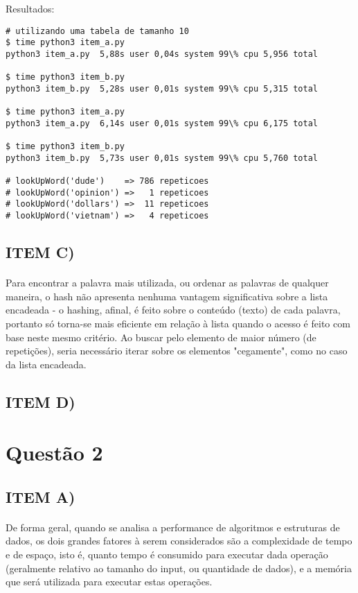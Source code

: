 \documentclass[12pt, letterpaper]{article}
\begin{document}
Resultados:

\begin{lstlisting}
# utilizando uma tabela de tamanho 10
$ time python3 item_a.py
python3 item_a.py  5,88s user 0,04s system 99\% cpu 5,956 total

$ time python3 item_b.py
python3 item_b.py  5,28s user 0,01s system 99\% cpu 5,315 total

$ time python3 item_a.py
python3 item_a.py  6,14s user 0,01s system 99\% cpu 6,175 total

$ time python3 item_b.py
python3 item_b.py  5,73s user 0,01s system 99\% cpu 5,760 total

# lookUpWord('dude')    => 786 repeticoes
# lookUpWord('opinion') =>   1 repeticoes
# lookUpWord('dollars') =>  11 repeticoes
# lookUpWord('vietnam') =>   4 repeticoes
\end{lstlisting}

\subsection{ITEM C)}
\paragraph{}
Para encontrar a palavra mais utilizada, ou ordenar as palavras de qualquer maneira,
o hash não apresenta nenhuma vantagem significativa sobre a lista encadeada - o hashing,
afinal, é feito sobre o conteúdo (texto) de cada palavra, portanto só torna-se mais
eficiente em relação à lista quando o acesso é feito com base neste mesmo critério.
Ao buscar pelo elemento de maior número (de repetições), seria necessário iterar sobre os
elementos "cegamente", como no caso da lista encadeada.

\subsection{ITEM D)}

\newpage
\section{Questão 2}
\subsection{ITEM A)}
\paragraph{}
De forma geral, quando se analisa a performance de algoritmos e estruturas de dados, os
dois grandes fatores à serem considerados são a complexidade de tempo e de espaço, isto é,
 quanto tempo é consumido para executar dada operação (geralmente relativo ao tamanho do
 input, ou quantidade de dados), e a memória que será utilizada para executar estas
 operações.
\end{document}
